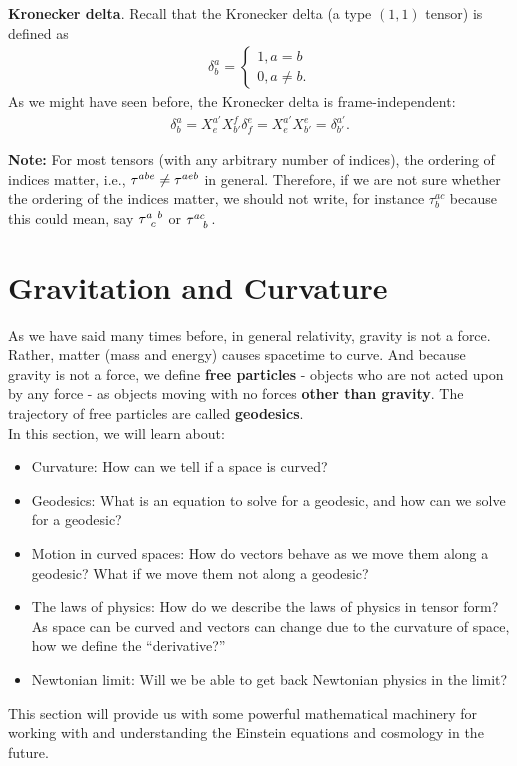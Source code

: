 \documentclass{book}
\theoremstyle{definition}
\begin{document}
\noindent \textbf{Kronecker delta}. Recall that the Kronecker delta (a type $(1,1)$ tensor) is defined as
\begin{align*}
\delta^a_b = \begin{cases*}
1, a=b\\
0, a\neq b.
\end{cases*}
\end{align*}
As we might have seen before, the Kronecker delta is frame-independent:
\begin{align*}
\delta^{a}_b =X^{a'}_{e}X^{f}_{b'}\delta^{e}_f = X^{a'}_eX^e_{b'} =\delta^{a'}_{b'}.
\end{align*}

\noindent \textbf{Note:} For most tensors (with any arbitrary number of indices), the ordering of indices matter, i.e., $\tensor{\tau}{^{abe}} \neq \tensor{\tau}{^{aeb}}$ in general. Therefore, if we are not sure whether the ordering of the indices matter, we should not write, for instance $\tau^{ac}_b$ because this could mean, say $\tensor{\tau}{^a_c^b}$ or $\tensor{\tau}{^{ac}_b}$. 
	 

\newpage

\chapter{Gravitation and Curvature}
As we have said many times before, in general relativity, gravity is not a force. Rather, matter (mass and energy) causes spacetime to curve. And because gravity is not a force, we define \textbf{free particles} - objects who are not acted upon by any force - as objects moving with no forces \textbf{other than gravity}. The trajectory of free particles are called \textbf{geodesics}. \\

In this section, we will learn about:
\begin{itemize}
	\item Curvature: How can we tell if a space is curved?
	\item Geodesics: What is an equation to solve for a geodesic, and how can we solve for a geodesic?
	\item Motion in curved spaces: How do vectors behave as we move them along a geodesic? What if we move them not along a geodesic?
	\item The laws of physics: How do we describe the laws of physics in tensor form? As space can be curved and vectors can change due to the curvature of space, how we define the ``derivative?''
	\item Newtonian limit: Will we be able to get back Newtonian physics in the limit?
\end{itemize}
This section will provide us with some powerful mathematical machinery for working with and understanding the Einstein equations and cosmology in the future.
\end{document}
